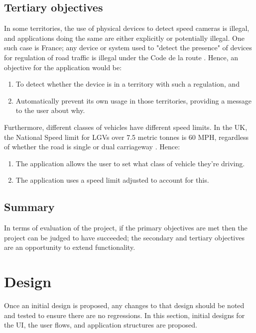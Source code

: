 \documentclass[11pt, a4paper, notitlepage]{report}
\newcounter{objectivesCounter}
\begin{document}
\section{Tertiary objectives}
In some territories, the use of physical devices to detect speed cameras is illegal, and applications doing the same are either explicitly or potentially illegal. One such case is France; any device or system used to "detect the presence" of devices for regulation of road traffic is illegal under the Code de la route \citep{CodeDeLaRoute}. Hence, an objective for the application would be:
\begin{enumerate}
	\setcounter{enumi}{\value{objectivesCounter}}
	\item To detect whether the device is in a territory with such a regulation, and
	\item Automatically prevent its own usage in those territories, providing a message to the user about why.
	\setcounter{objectivesCounter}{\value{enumi}}
\end{enumerate}

Furthermore, different classes of vehicles have different speed limits. In the UK, the National Speed limit for LGVs over 7.5 metric tonnes is 60 MPH, regardless of whether the road is single or dual carriageway \citep{GovUKSpeedLimits}. Hence:
\begin{enumerate}
	\setcounter{enumi}{\value{objectivesCounter}}
	\item The application allows the user to set what class of vehicle they're driving.
	\item The application uses a speed limit adjusted to account for this.
	\setcounter{objectivesCounter}{\value{enumi}}
\end{enumerate}

\section{Summary}
In terms of evaluation of the project, if the primary objectives are met then the project can be judged to have succeeded; the secondary and tertiary objectives are an opportunity to extend functionality.

\chapter{Design}
Once an initial design is proposed, any changes to that design should be noted and tested to ensure there are no regressions. In this section, initial designs for the UI, the user flows, and application structures are proposed.
\end{document}
